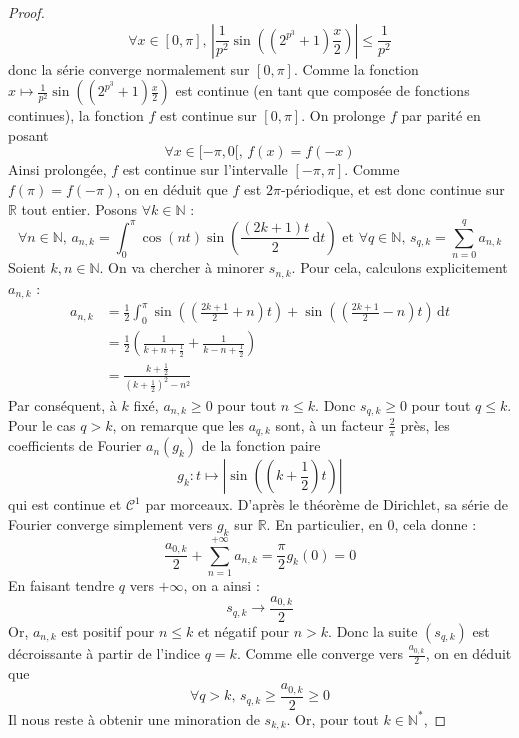 	\begin{proof}
		\[ \forall x \in [0, \pi], \, \left| \frac{1}{p^2} \sin \left( (2^{p^3} + 1) \frac{x}{2} \right) \right| \leq \frac{1}{p^2} \]
		donc la série converge normalement sur $[0, \pi]$. Comme la fonction $x \mapsto \frac{1}{p^2} \sin \left( (2^{p^3} + 1) \frac{x}{2} \right)$ est continue (en tant que composée de fonctions continues), la fonction $f$ est continue sur $[0, \pi]$. On prolonge $f$ par parité en posant
		\[ \forall x \in [-\pi, 0[, \, f(x) = f(-x) \]
		Ainsi prolongée, $f$ est continue sur l'intervalle $[-\pi, \pi]$. Comme $f(\pi) = f(-\pi)$, on en déduit que $f$ est $2\pi$-périodique, et est donc continue sur $\mathbb{R}$ tout entier.
		\newpar
		Posons $\forall k \in \mathbb{N}$ :
		\[ \forall n \in \mathbb{N}, \, a_{n,k} = \int_0^{\pi} \cos(nt) \sin \left( \frac{(2k+1) t}{2} \, \mathrm{d}t \right) \text{ et } \forall q \in \mathbb{N}, \, s_{q,k} = \sum_{n=0}^{q} a_{n,k} \]
		Soient $k, n \in \mathbb{N}$. On va chercher à minorer $s_{n,k}$. Pour cela, calculons explicitement $a_{n,k}$ :
		\begin{align*}
			a_{n,k} &= \frac{1}{2} \int_0^{\pi} \sin \left( \left( \frac{2k+1}{2} + n \right) t \right) + \sin \left( \left( \frac{2k+1}{2} - n \right) t \right) \, \mathrm{d}t \\
			&= \frac{1}{2} \left( \frac{1}{k+n+\frac{1}{2}} + \frac{1}{k-n+\frac{1}{2}} \right) \\
			&= \frac{k+\frac{1}{2}}{\left( k + \frac{1}{2} \right)^2 - n^2}
		\end{align*}
		Par conséquent, à $k$ fixé, $a_{n,k} \geq 0$ pour tout $n \leq k$. Donc $s_{q,k} \geq 0$ pour tout $q \leq k$. Pour le cas $q > k$, on remarque que les $a_{q,k}$ sont, à un facteur $\frac{2}{\pi}$ près, les coefficients de Fourier $a_n(g_k)$ de la fonction paire
		\[ g_k : t \mapsto \left| \sin \left( (k + \frac{1}{2}) t \right) \right| \]
		qui est continue et $\mathcal{C}^1$ par morceaux. D'après le théorème de Dirichlet, sa série de Fourier converge simplement vers $g_k$ sur $\mathbb{R}$. En particulier, en $0$, cela donne :
		\[ \frac{a_{0,k}}{2} + \sum_{n=1}^{+\infty} a_{n,k} = \frac{\pi}{2} g_k(0) = 0 \]
		En faisant tendre $q$ vers $+\infty$, on a ainsi :
		\[ s_{q,k} \longrightarrow \frac{a_{0,k}}{2} \]
		Or, $a_{n,k}$ est positif pour $n \leq k$ et négatif pour $n > k$. Donc la suite $(s_{q,k})$ est décroissante à partir de l'indice $q = k$. Comme elle converge vers $\frac{a_{0,k}}{2}$, on en déduit que
		\[ \forall q > k, \, s_{q, k} \geq \frac{a_{0,k}}{2} \geq 0 \]
		Il nous reste à obtenir une minoration de $s_{k,k}$. Or, pour tout $k \in \mathbb{N}^*$,

\end{proof}
